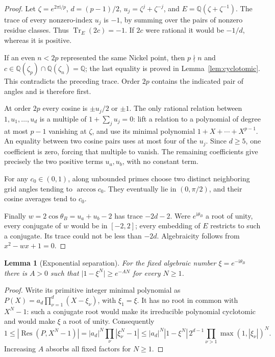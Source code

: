 \documentclass[11pt]{article}
\numberwithin{equation}{section}
\newtheorem{lemma}[theorem]{Lemma}
\theoremstyle{definition}
\newcommand{\ii}{\mathrm i}
\newcommand{\Q}{\mathbb Q}
\newcommand{\Res}{\operatorname{Res}}
\begin{document}
\begin{proof}
Let \(\zeta=e^{2\pi\ii/p}\), \(d=(p-1)/2\),
\(u_j=\zeta^j+\zeta^{-j}\), and \(E=\Q(\zeta+\zeta^{-1})\).
The trace of every nonzero-index \(u_j\) is \(-1\), by summing over the
pairs of nonzero residue classes. Thus
\(\operatorname{Tr}_E(2c)=-1\). If \(2c\) were rational it would be
\(-1/d\), whereas it is positive.

If an even \(n<2p\) represented the same Nickel point, then \(p\nmid n\)
and \(c\in\Q(\zeta_p)\cap\Q(\zeta_n)=\Q\);
the last equality is proved in Lemma~\ref{lem:cyclotomic}.
This contradicts the preceding trace. Order \(2p\) contains the indicated
pair of angles and is therefore first.

At order \(2p\) every cosine is \(\pm u_j/2\) or \(\pm1\).
The only rational relation between \(1,u_1,\ldots,u_d\) is a multiple of
\(1+\sum_j u_j=0\): lift a relation to a polynomial of degree at most
\(p-1\) vanishing at \(\zeta\), and use its minimal polynomial
\(1+X+\cdots+X^{p-1}\). An equality between two cosine pairs uses at most
four of the \(u_j\). Since \(d\ge5\), one coefficient is zero, forcing
that multiple to vanish. The remaining coefficients give precisely the
two positive terms \(u_a,u_b\), with no constant term.

For any \(c_0\in(0,1)\), along unbounded primes choose two distinct
neighboring grid angles tending to \(\arccos c_0\). They eventually lie
in \((0,\pi/2)\), and their cosine averages tend to \(c_0\).

Finally \(w=2\cos\theta_B=u_a+u_b-2\) has trace \(-2d-2\).
Were \(e^{\ii\theta_B}\) a root of unity, every conjugate of \(w\)
would be in \([-2,2]\); every embedding of \(E\) restricts to such a
conjugate. Its trace could not be less than \(-2d\).
Algebraicity follows from \(x^2-wx+1=0\).
\end{proof}

\begin{lemma}[Exponential separation]\label{lem:resultant}
For the fixed algebraic number \(\xi=e^{-\ii\theta_B}\) there is
\(A>0\) such that \(\lvert1-\xi^N\rvert\ge e^{-AN}\) for every \(N\ge1\).
\end{lemma}
\begin{proof}
Write its primitive integer minimal polynomial as
\(P(X)=a_d\prod_{\nu=1}^d(X-\xi_\nu)\), with \(\xi_1=\xi\).
It has no root in common with \(X^N-1\): such a conjugate root would make
its irreducible polynomial cyclotomic and would make \(\xi\) a root of
unity. Consequently
\[
 1\le |\Res(P,X^N-1)|
 =|a_d|^N\prod_\nu|\xi_\nu^N-1|
 \le |a_d|^N|1-\xi^N|\,2^{d-1}
       \prod_{\nu>1}\max(1,|\xi_\nu|)^N.
\]
Increasing \(A\) absorbs all fixed factors for \(N\ge1\).
\end{proof}
\end{document}
